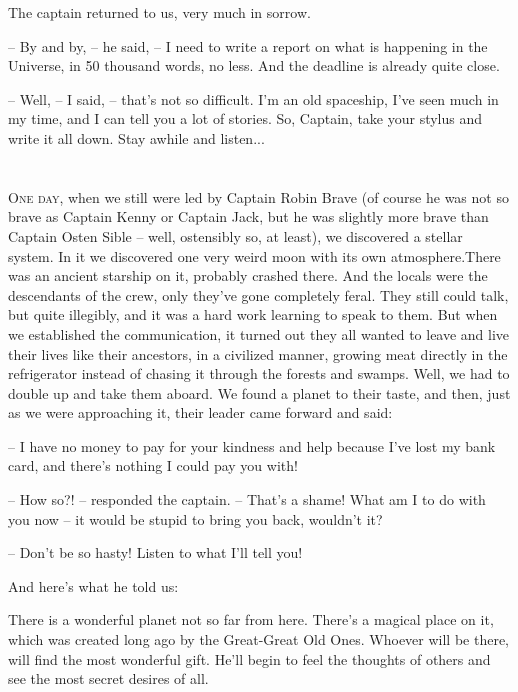 \documentclass[ebook,oneside,final,openright]{memoir}
\begin{document}
\par
The captain returned to us, very much in sorrow.\par
– By and by, – he said, – I need to write a report on what is happening in the Universe, in 50 thousand words, no less. And the deadline is already quite close.\par
– Well, – I said, – that’s not so difficult. I’m an old spaceship, I’ve seen much in my time, and I can tell you a lot of stories. So, Captain, take your stylus and write it all down. Stay awhile and listen...
\chapter{}
\par
\lettrine{O}{ne day,} when we still were led by Captain Robin Brave (of course he was not so brave as Captain Kenny or Captain Jack, but he was slightly more brave than Captain Osten Sible – well, ostensibly so, at least), we discovered a stellar system. In it we discovered one very weird moon with its own atmosphere.There was an ancient starship on it, probably crashed there. And the locals were the descendants of the crew, only they’ve gone completely feral. They still could talk, but quite illegibly, and it was a hard work learning to speak to them. But when we established the communication, it turned out they all wanted to leave and live their lives like their ancestors, in a civilized manner, growing meat directly in the refrigerator instead of chasing it through the forests and swamps. Well, we had to double up and take them aboard. We found a planet to their taste, and then, just as we were approaching it, their leader came forward and said: \par
\par
– I have no money to pay for your kindness and help because I’ve lost my bank card, and there’s nothing I could pay you with!\par
– How so?! – responded the captain. – That’s a shame! What am I to do with you now – it would be stupid to bring you back, wouldn’t it? \par
– Don’t be so hasty! Listen to what I’ll tell you! \par
 And here’s what he told us:\par
\par
 There is a wonderful planet not so far from here. There’s a magical place on it, which was created long ago by the Great-Great Old Ones. Whoever will be there, will find the most wonderful gift. He’ll begin to feel the thoughts of others and see the most secret desires of all. \par
\end{document}
